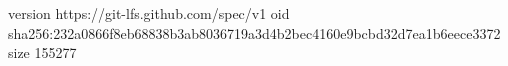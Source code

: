version https://git-lfs.github.com/spec/v1
oid sha256:232a0866f8eb68838b3ab8036719a3d4b2bec4160e9bcbd32d7ea1b6eece3372
size 155277
